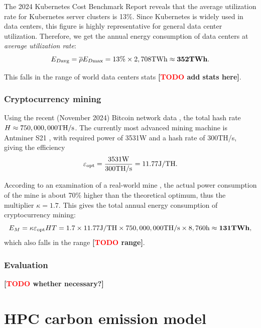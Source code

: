 \documentclass[12pt]{article}
\newcommand{\todo}[1]{\textbf{[\textcolor{red}{TODO} #1]}}
\begin{document}
The 2024 Kubernetes Cost Benchmark Report \citep{kubernetes_report} reveals that the average utilization rate for Kubernetes server clusters is 13\%. Since Kubernetes is widely used in data centers, this figure is highly representative for general data center utilization. Therefore, we get the annual energy consumption of data centers at \textit{average utilization rate}:
\begin{equation}
	E_{D \rm avg} = \overline{\rho} E_{D \rm max}
	= \rm 13\% \times 2,708TWh \approx \mathbf{352TWh}.
\end{equation}

This falls in the range of world data centers stats \todo{add stats here}.

\subsubsection{Cryptocurrency mining}

Using the recent (November 2024) Bitcoin network data \citep{hashrate}, the total hash rate $H \approx \rm 750,000,000TH/s$. The currently most advanced mining machine is Antminer S21 \citep{best_miner}, with required power of 3531W and a hash rate of 300TH/s, giving the efficiency
\begin{equation}
	\varepsilon_{\rm opt} = \rm \frac{3531W}{300TH/s} = 11.77J/TH.
\end{equation}

According to an examination of a real-world mine \citep{miner_avg_eff}, the actual power consumption of the mine is about 70\% higher than the theoretical optimum, thus the multiplier $\kappa = 1.7$. This gives the total annual energy consumption of cryptocurrency mining:
\begin{equation}
	E_M = \kappa \varepsilon_{\rm opt} HT
	= \rm 1.7 \times 11.77J/TH \times 750,000,000TH/s \times 8,760h \approx \mathbf{131TWh},
\end{equation}
which also falls in the range \todo{range}.

\subsubsection{Evaluation}

\todo{whether necessary?}

\section{HPC carbon emission model}
\end{document}
